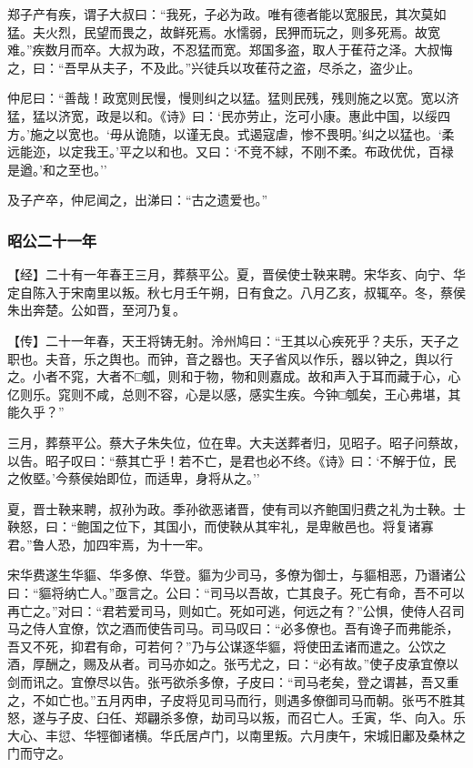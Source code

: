 \documentclass[]{article}
\begin{document}
郑子产有疾，谓子大叔曰：``我死，子必为政。唯有德者能以宽服民，其次莫如猛。夫火烈，民望而畏之，故鲜死焉。水懦弱，民狎而玩之，则多死焉。故宽难。''疾数月而卒。大叔为政，不忍猛而宽。郑国多盗，取人于萑苻之泽。大叔悔之，曰：``吾早从夫子，不及此。''兴徒兵以攻萑苻之盗，尽杀之，盗少止。

仲尼曰：``善哉！政宽则民慢，慢则纠之以猛。猛则民残，残则施之以宽。宽以济猛，猛以济宽，政是以和。《诗》曰：`民亦劳止，汔可小康。惠此中国，以绥四方。'施之以宽也。`毋从诡随，以谨无良。式遏寇虐，惨不畏明。'纠之以猛也。`柔远能迩，以定我王。'平之以和也。又曰：`不竞不絿，不刚不柔。布政优优，百禄是遒。'和之至也。''

及子产卒，仲尼闻之，出涕曰：``古之遗爱也。''

\hypertarget{header-n2712}{%
\subsubsection{昭公二十一年}\label{header-n2712}}

【经】二十有一年春王三月，葬蔡平公。夏，晋侯使士鞅来聘。宋华亥、向宁、华定自陈入于宋南里以叛。秋七月壬午朔，日有食之。八月乙亥，叔辄卒。冬，蔡侯朱出奔楚。公如晋，至河乃复。

【传】二十一年春，天王将铸无射。泠州鸠曰：``王其以心疾死乎？夫乐，天子之职也。夫音，乐之舆也。而钟，音之器也。天子省风以作乐，器以钟之，舆以行之。小者不窕，大者不□瓠，则和于物，物和则嘉成。故和声入于耳而藏于心，心亿则乐。窕则不咸，总则不容，心是以感，感实生疾。今钟□瓠矣，王心弗堪，其能久乎？''

三月，葬蔡平公。蔡大子朱失位，位在卑。大夫送葬者归，见昭子。昭子问蔡故，以告。昭子叹曰：``蔡其亡乎！若不亡，是君也必不终。《诗》曰：`不解于位，民之攸塈。'今蔡侯始即位，而适卑，身将从之。''

夏，晋士鞅来聘，叔孙为政。季孙欲恶诸晋，使有司以齐鲍国归费之礼为士鞅。士鞅怒，曰：``鲍国之位下，其国小，而使鞅从其牢礼，是卑敝邑也。将复诸寡君。''鲁人恐，加四牢焉，为十一牢。

宋华费遂生华貙、华多僚、华登。貙为少司马，多僚为御士，与貙相恶，乃谮诸公曰：``貙将纳亡人。''亟言之。公曰：``司马以吾故，亡其良子。死亡有命，吾不可以再亡之。''对曰：``君若爱司马，则如亡。死如可逃，何远之有？''公惧，使侍人召司马之侍人宜僚，饮之酒而使告司马。司马叹曰：``必多僚也。吾有谗子而弗能杀，吾又不死，抑君有命，可若何？''乃与公谋逐华貙，将使田孟诸而遣之。公饮之酒，厚酬之，赐及从者。司马亦如之。张丐尤之，曰：``必有故。''使子皮承宜僚以剑而讯之。宜僚尽以告。张丐欲杀多僚，子皮曰：``司马老矣，登之谓甚，吾又重之，不如亡也。''五月丙申，子皮将见司马而行，则遇多僚御司马而朝。张丐不胜其怒，遂与子皮、臼任、郑翩杀多僚，劫司马以叛，而召亡人。壬寅，华、向入。乐大心、丰愆、华牼御诸横。华氏居卢门，以南里叛。六月庚午，宋城旧鄘及桑林之门而守之。
\end{document}
